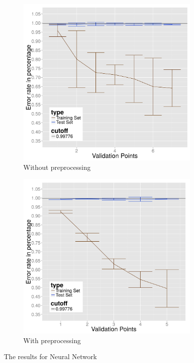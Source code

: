 \begin{figure}
  \centering
    \begin{subfigure}{.5\linewidth}
      \centering
      \includegraphics[width=0.95\linewidth]{Images/DNNraw}
      \caption{Without preprocessing}
      \label{fig:nn-resized}
    \end{subfigure}%
    \begin{subfigure}{.5\linewidth}
      \centering
      \includegraphics[width=0.95\linewidth]{Images/DNNpreprocessed}
      \caption{With preprocessing}
      \label{fig:nn-preprocessed}
    \end{subfigure}
  \caption{The results for Neural Network}
  \label{fig:neural-network}
\end{figure}

